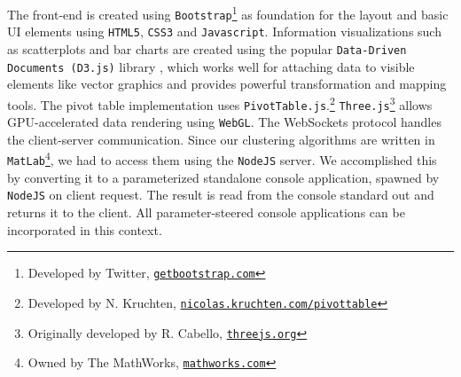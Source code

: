 \documentclass[journal]{style/vgtc} 			          %
\begin{document}
The front-end is created using \texttt{Bootstrap}\footnote{Developed by Twitter, \href{http://getbootstrap.com}{\texttt{getbootstrap.com}}} as foundation for the layout and basic UI elements using \texttt{HTML5}, \texttt{CSS3} and \texttt{Javascript}.
%
Information visualizations such as scatterplots and bar charts are created using the popular \texttt{Data-Driven Documents (D3.js)} library \cite{D3}, which works well for attaching data to visible elements like vector graphics and provides powerful transformation and mapping tools.
%
The pivot table implementation uses \texttt{PivotTable.js}.\footnote{Developed by N. Kruchten, \href{http://nicolas.kruchten.com/pivottable}{\texttt{nicolas.kruchten.com/pivottable}}}
%
\texttt{Three.js}\footnote{Originally developed by R. Cabello, \href{http://threejs.org}{\texttt{threejs.org}}} allows GPU-accelerated data rendering using \texttt{WebGL}.
%
The WebSockets protocol handles the client-server communication. 
%
Since our clustering algorithms are written in \texttt{MatLab}\footnote{Owned by The MathWorks, \href{http://mathworks.com}{\texttt{mathworks.com}}}, we had to access them using the \texttt{NodeJS} server.
%
We accomplished this by converting it to a parameterized standalone console application, spawned by \texttt{NodeJS} on client request.
%
The result is read from the console standard out and returns it to the client.
%
All parameter-steered console applications can be incorporated in this context.
%
\end{document}
